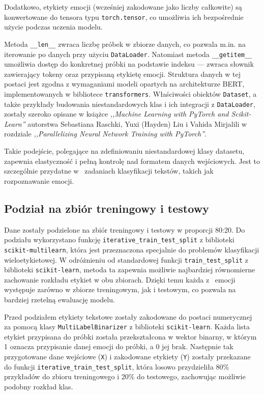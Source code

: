 \documentclass[wmii, inf, mgr]{uwmthesis}
\begin{document}
Dodatkowo, etykiety emocji (wcześniej zakodowane jako liczby całkowite) są konwertowane do tensora typu \texttt{torch.tensor}, co umożliwia ich bezpośrednie użycie podczas uczenia modelu.

Metoda \texttt{\_\_len\_\_} zwraca liczbę próbek w zbiorze danych, co pozwala m.in. na iterowanie po danych przy użyciu \texttt{DataLoader}. Natomiast metoda \texttt{\_\_getitem\_\_} umożliwia dostęp do konkretnej próbki na podstawie indeksu — zwraca słownik zawierający tokeny oraz przypisaną etykietę emocji. Struktura danych w tej postaci jest zgodna z wymaganiami modeli opartych na architekturze BERT, implementowanych w bibliotece \texttt{transformers}. Właściwości obiektów \texttt{Dataset}, a także przykłady budowania niestandardowych klas i ich integracji z \texttt{DataLoader}, zostały szeroko opisane w książce \textit{,,Machine Learning with PyTorch and Scikit-Learn''} \cite{MLpytorch} autorstwa Sebastiana Raschki, Yuxi (Hayden) Liu i Vahida Mirjalili w rozdziale \textit{,,Parallelizing Neural Network Training with PyTorch''}.

Takie podejście, polegające na zdefiniowaniu niestandardowej klasy datasetu, zapewnia elastyczność i pełną kontrolę nad formatem danych wejściowych. Jest to szczególnie przydatne w~ zadaniach klasyfikacji tekstów, takich jak rozpoznawanie emocji.

\subsection{Podział na zbiór treningowy i testowy}
Dane zostały podzielone na zbiór treningowy i testowy w proporcji 80:20. Do podziału wykorzystano funkcję \texttt{iterative\_train\_test\_split} z biblioteki \texttt{scikit-multilearn}, która jest przeznaczona specjalnie do problemów klasyfikacji wieloetykietowej. W odróżnieniu od standardowej funkcji \texttt{train\_test\_split} z biblioteki \texttt{scikit-learn}, metoda ta zapewnia możliwie najbardziej równomierne zachowanie rozkładu etykiet w obu zbiorach. Dzięki temu każda z~ emocji występuje zarówno w zbiorze treningowym, jak i testowym, co pozwala na bardziej rzetelną ewaluację modelu.

Przed podziałem etykiety tekstowe zostały zakodowane do postaci numerycznej za pomocą klasy \texttt{MultiLabelBinarizer} z biblioteki \texttt{scikit-learn}. Każda lista etykiet przypisana do próbki została przekształcona w wektor binarny, w którym 1 oznacza przypisanie danej emocji do próbki, a 0 jej brak. Następnie tak przygotowane dane wejściowe (\texttt{X}) i zakodowane etykiety (\texttt{Y}) zostały przekazane do funkcji \texttt{iterative\_train\_test\_split}, która losowo przydzieliła 80\% przykładów do zbioru treningowego i 20\% do testowego, zachowując możliwie podobny rozkład klas.
\end{document}
